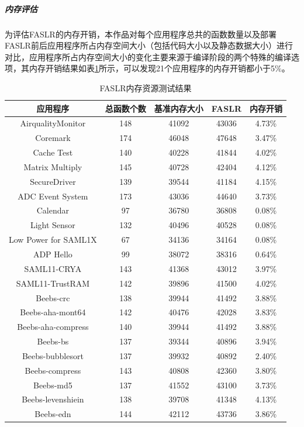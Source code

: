 \documentclass[UTF8,12pt,a4paper,twoside]{ctexart}
\numberwithin{figure}{section}
\begin{document}
\subparagraph{内存评估}
\par 为评估FASLR的内存开销，本作品对每个应用程序总共的函数数量以及部署FASLR前后应用程序所占内存空间大小（包括代码大小以及静态数据大小）进行对比，应用程序所占内存空间大小的变化主要来源于编译阶段的两个特殊的编译选项，其内存开销结果如表\ref{table2}所示，可以发现21个应用程序的内存开销都小于5\%。
\begin{longtable}{ccccc}
    \caption{FASLR内存资源测试结果}
    \label{table2}                                         \\
    \hline
    应用程序                 & 总函数个数 & 基准内存大小 & FASLR & 内存开销   \\ \hline
    AirqualityMonitor    & 148   & 41092  & 43036 & 4.73\% \\ 
    Coremark             & 174   & 46048  & 47648 & 3.47\% \\ 
    Cache Test           & 140   & 40228  & 41844 & 4.02\% \\ 
    Matrix Multiply      & 145   & 40728  & 42404 & 4.12\% \\ 
    SecureDriver         & 139   & 39544  & 41184 & 4.15\% \\ 
    ADC Event System     & 173   & 43036  & 44640 & 3.73\% \\ 
    Calendar             & 97    & 36780  & 36808 & 0.08\% \\ 
    Light Sensor         & 132   & 40496  & 40528 & 0.08\% \\ 
    Low Power for SAML1X & 67    & 34136  & 34164 & 0.08\% \\ 
    ADP Hello            & 99    & 38072  & 38316 & 0.64\% \\ 
    SAML11-CRYA          & 143   & 41368  & 43012 & 3.97\% \\ 
    SAML11-TrustRAM      & 142   & 39896  & 41500 & 4.02\% \\ 
    Beebs-crc            & 138   & 39944  & 41492 & 3.88\% \\ 
    Beebs-aha-mont64     & 142   & 40476  & 42028 & 3.83\% \\ 
    Beebs-aha-compress   & 140   & 39944  & 41492 & 3.88\% \\ 
    Beebs-bs             & 137   & 39344  & 40896 & 3.94\% \\ 
    Beebs-bubblesort     & 137   & 39932  & 40892 & 2.40\% \\ 
    Beebs-compress       & 143   & 40808  & 42360 & 3.80\% \\ 
    Beebs-md5            & 137   & 41552  & 43100 & 3.73\% \\ 
    Beebs-levenshiein    & 138   & 39708  & 41348 & 4.13\% \\ 
    Beebs-edn            & 144   & 42112  & 43736 & 3.86\% \\ \hline
\end{longtable}
\end{document}

